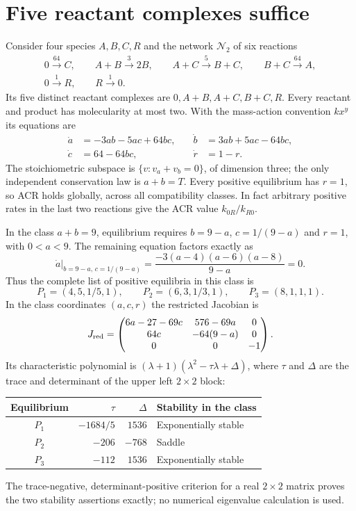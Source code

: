 \documentclass[11pt,a4paper]{report}
\begin{document}
\section{Five reactant complexes suffice}\label{sec:five}
Consider four species $A,B,C,R$ and the network $\mathcal N_2$ of six reactions
\begin{equation}\label{eq:network}
\begin{gathered}
 0\xrightarrow{64}C,\qquad A+B\xrightarrow{3}2B,\qquad
 A+C\xrightarrow{5}B+C,\qquad B+C\xrightarrow{64}A,\\
 0\xrightarrow{1}R,\qquad R\xrightarrow{1}0.
\end{gathered}
\end{equation}
Its five distinct reactant complexes are $0,A+B,A+C,B+C,R$. Every reactant and product has
molecularity at most two. With the mass-action convention $k x^y$ its equations are
\begin{equation}\label{eq:exampleode}
\begin{aligned}
 \dot a&=-3ab-5ac+64bc, &\quad \dot b&=3ab+5ac-64bc,\\
 \dot c&=64-64bc, &\quad \dot r&=1-r.
\end{aligned}
\end{equation}
The stoichiometric subspace is $\{v:v_a+v_b=0\}$, of dimension three; the only independent
conservation law is $a+b=T$. Every positive equilibrium has $r=1$, so ACR holds globally, across
all compatibility classes. In fact arbitrary positive rates in the last two reactions give the
ACR value $k_{0R}/k_{R0}$.

In the class $a+b=9$, equilibrium requires $b=9-a$, $c=1/(9-a)$ and $r=1$, with $0<a<9$.
The remaining equation factors exactly as
\[
 \dot a\big|_{b=9-a,\,c=1/(9-a)}
 =\frac{-3(a-4)(a-6)(a-8)}{9-a}=0.
\]
Thus the complete list of positive equilibria in this class is
\[
 P_1=(4,5,1/5,1),\qquad P_2=(6,3,1/3,1),\qquad P_3=(8,1,1,1).
\]
In the class coordinates $(a,c,r)$ the restricted Jacobian is
\[
 J_{\rm red}=\begin{pmatrix}
 6a-27-69c&576-69a&0\\
 64c&-64(9-a)&0\\
 0&0&-1
 \end{pmatrix}.
\]
Its characteristic polynomial is $(\lambda+1)(\lambda^2-\tau\lambda+\Delta)$, where
$\tau$ and $\Delta$ are the trace and determinant of the upper left $2\times2$ block:
\begin{center}
\begin{tabular}{crrl}
\toprule
Equilibrium & $\tau$ & $\Delta$ & Stability in the class\\
\midrule
$P_1$ & $-1684/5$ & $1536$ & Exponentially stable\\
$P_2$ & $-206$ & $-768$ & Saddle\\
$P_3$ & $-112$ & $1536$ & Exponentially stable\\
\bottomrule
\end{tabular}
\end{center}
The trace-negative, determinant-positive criterion for a real $2\times2$ matrix proves the two
stability assertions exactly; no numerical eigenvalue calculation is used.
\end{document}
